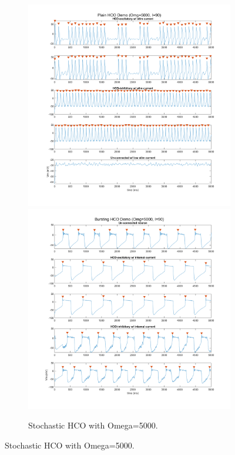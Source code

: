 \documentclass[
]{article}
\begin{document}
\begin{figure} \ContinuedFloat
  \centering
  \begin{subfigure}[b]{\textwidth}  
    \includegraphics[width=.49\textwidth]{figs/old/Fx1_C_HCO_Om5e3_NB.png}
    \includegraphics[width=.49\textwidth]{figs/old/Fx1_C_HCO_Om5e3_B.png}
    \vspace{-0.5cm} \caption{Stochastic HCO with Omega=5000.}
  \end{subfigure}
 \end{figure}
\end{document}
